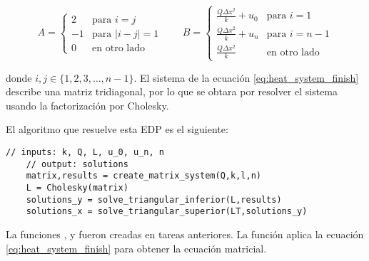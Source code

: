 \begin{equation}
    A =
    \begin{cases}
        2  & \text{para }          i=j     \\
        -1 & \text{para }          |i-j|=1 \\
        0  & \text{en otro lado}
    \end{cases}
    \qquad
    B = \begin{cases}
        \frac{Q\Delta x^2}{k}+u_0 & \text{para } i=1    \\
        \frac{Q\Delta x^2}{k}+u_n & \text{para } i=n-1  \\
        \frac{Q\Delta x^2}{k}     & \text{en otro lado}
    \end{cases}
    \label{eq:heat_system_finish}
\end{equation}

donde $i,j \in\{1,2,3,\dots,n-1\}$. El sistema de la ecuación \ref{eq:heat_system_finish} describe una matriz tridiagonal, por lo que se obtara por resolver el sistema usando la factorización por Cholesky.

El algoritmo que resuelve esta EDP es el siguiente:

\begin{lstlisting}[style=CStyle]
    // inputs: k, Q, L, u_0, u_n, n
    // output: solutions
    matrix,results = create_matrix_system(Q,k,l,n)
    L = Cholesky(matrix)
    solutions_y = solve_triangular_inferior(L,results)
    solutions_x = solve_triangular_superior(LT,solutions_y)
\end{lstlisting}

La funciones ,  y  fueron creadas en tareas anteriores. La función  aplica la ecuación \ref{eq:heat_system_finish} para obtener la ecuación matricial.